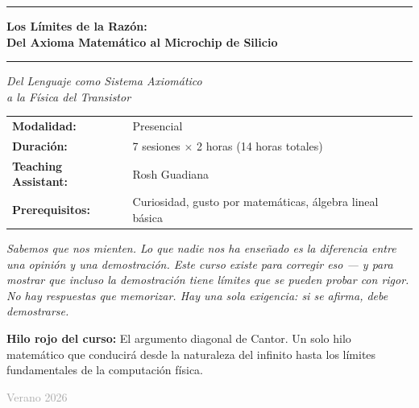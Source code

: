 \documentclass[11pt, letterpaper]{article}
\begin{document}
\begin{titlepage}
\begin{center}

\textcolor{mitred}{\rule{\linewidth}{1.2pt}}
\vspace{0.4cm}

{\LARGE\bfseries Los Límites de la Razón:\\ [0.3em] Del Axioma Matemático al Microchip de Silicio}

\vspace{0.3cm}
\textcolor{mitred}{\rule{\linewidth}{1.2pt}}
\vspace{0.6cm}

{\large\itshape Del Lenguaje como Sistema Axiom\'atico\\
a la F\'isica del Transistor}

\vspace{1.4cm}

\begin{tabular}{ll}
\textbf{Modalidad:}           & Presencial \\[3pt]
\textbf{Duraci\'on:}          & 7 sesiones $\times$ 2 horas (14 horas totales) \\[3pt]
\textbf{Teaching Assistant:}  & Rosh Guadiana \\[3pt]
\textbf{Prerequisitos:}       & Curiosidad, gusto por matem\'aticas, \'algebra lineal b\'asica \\[3pt]
\end{tabular}

\vspace{1.6cm}

\begin{tcolorbox}[
  colback=mitred!4, colframe=mitred,
  boxrule=0.8pt, left=10pt, right=10pt, top=8pt, bottom=8pt]
{\small\itshape
Sabemos que nos mienten.
Lo que nadie nos ha ense\~nado es la diferencia entre
una opini\'on y una demostraci\'on.
Este curso existe para corregir eso
--- y para mostrar que incluso la demostraci\'on tiene l\'imites
que se pueden probar con rigor.
\medskip
No hay respuestas que memorizar. Hay una sola exigencia:
si se afirma, debe demostrarse.}
\end{tcolorbox}

\vspace{1.2cm}

\begin{tcolorbox}[
  colback=white, colframe=diagonalred,
  boxrule=0.6pt, left=8pt, right=8pt, top=6pt, bottom=6pt]
{\footnotesize\textbf{Hilo rojo del curso:} El argumento diagonal de Cantor.
Un solo hilo matem\'atico que conducir\'a desde la naturaleza del infinito hasta los l\'imites fundamentales de la computaci\'on f\'isica.}
\end{tcolorbox}

\vfill
{\small\textcolor{darkgray}{Verano 2026}}
\end{center}
\end{titlepage}
\end{document}
